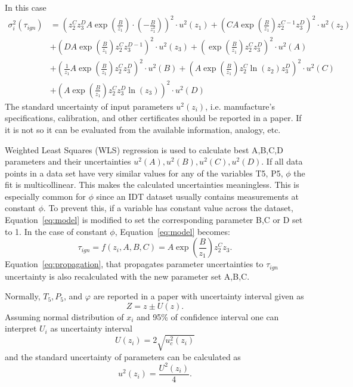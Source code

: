 In this case
\begin{align}
	\label{eq:propagation}
	\sigma_i^2(\tau_{ign}) &= \left( z_2^C z_3^D A \exp \left( \frac{B}{z_1} \right) \cdot \left( -\frac{B}{z_1^2} \right) \right)^2 \cdot u^2(z_1) + \left( C A \exp \left( \frac{B}{z_1} \right) z_2^{C-1} z_3^D \right)^2 \cdot u^2(z_2) \nonumber \\
	&+ \left( D A \exp \left( \frac{B}{z_1} \right) z_2^C z_3^{D-1} \right)^2 \cdot u^2(z_3) + \left( \exp \left( \frac{B}{z_1} \right) z_2^C z_3^D \right)^2 \cdot u^2(A) \nonumber \\
	&+ \left( \frac{1}{z_1} A \exp \left( \frac{B}{z_1} \right) z_2^C z_3^D \right)^2 \cdot u^2(B) + \left( A \exp \left( \frac{B}{z_1} \right) z_2^C \ln(z_2) z_3^D \right)^2 \cdot u^2(C) \nonumber \\
	&+ \left( A \exp \left( \frac{B}{z_1} \right) z_2^C z_3^D \ln(z_3) \right)^2 \cdot u^2(D)
\end{align}
The standard uncertainty of input parameters $u^2(z_i)$, i.e. manufacture's specifications, calibration, and other certificates should be reported in a paper. If it is not so it can be evaluated from the available information, analogy, etc. 

Weighted Least Squares (WLS) regression is used to calculate best A,B,C,D parameters and their uncertainties $u^2(A), u^2(B), u^2(C), u^2(D)$. If all data points in a data set have very similar values for any of the variables T5, P5, $\phi$ the fit is multicollinear. This makes the calculated uncertainties meaningless. This is especially common for $\phi$ since an IDT dataset usually contains measurements at constant $\phi$. To prevent this, if a variable has constant value across the dataset, Equation~\ref{eq:model} is modified to set the corresponding parameter B,C or D set to 1. In the case of constant $\phi$, Equation~\ref{eq:model} becomes:
\begin{equation}
	\tau_{ign} = f(z_i, A, B, C) = A \exp \left( \frac{B}{z_1} \right) z_2^C z_3.
\end{equation}
Equation~\ref{eq:propagation}, that propagates parameter uncertainties to $\tau_{ign}$ uncertainty is also recalculated with the new parameter set A,B,C.


Normally, $T_5, P_5$, and $\varphi$ are reported in a paper with uncertainty interval given as
\begin{equation}
	Z = z \pm U(z).
\end{equation}
Assuming normal distribution of $x_i$ and 95\% of confidence interval one can interpret $U_i$ as uncertainty interval
\begin{equation}
	U(z_i) = 2 \sqrt{u_c^2(z_i)}
\end{equation}
and the standard uncertainty of parameters can be calculated as
\begin{equation}
	u^2(z_i) = \frac{U^2(z_i)}{4}.
\end{equation}


